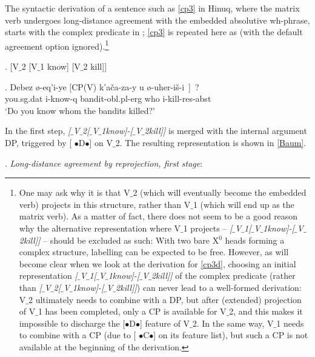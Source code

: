 \documentclass[output=paper
,modfonts
,nonflat]{langsci/langscibook}
\begin{document}
The syntactic derivation of a sentence such as \ref{cp3} in Hinuq,
where the matrix verb undergoes long-distance agreement with the
embedded absolutive wh-phrase, starts with the complex predicate in
\Next; \ref{cp3} is repeated here as \NNext (with the default
agreement option ignored).\footnote{\label{vari2}One may ask why it is
  that V$\_$2 (which will eventually become the embedded verb) projects
  in this structure, rather than V$\_$1 (which will end up as the matrix
  verb).  As a matter of fact, there does not seem to be a good reason
  why the alternative representation where V$\_$1 projects -- {\it
    [$\_${V$\_$1}[$\_${V$\_$1}know]-[$\_${V$\_$2}kill]]} -- should be excluded as such:
  With two bare X$^0$ heads forming a complex structure, labelling can
  be expected to be free. However, as will become clear when we look
  at the derivation for \ref{cp3d}, choosing an initial representation
  {\it [$\_${V$\_$1}[$\_${V$\_$1}know]-[$\_${V$\_$2}kill]]} of the complex predicate
  (rather than {\it [$\_${V$\_$2}[$\_${V$\_$1}know]-[$\_${V$\_$2}kill]]}) can never lead
  to a well-formed derivation: V$\_$2 ultimately needs to combine with a
  DP, but after (extended) projection of V$\_$1 has been completed, only
  a CP is available for V$\_$2, and this makes it impossible to discharge
  the [{\small $\bullet$}D{\small $\bullet$}] feature of V$\_$2. In the
  same way, V$\_$1 needs to combine with a CP (due to [{\small
      $\bullet$}C{\small $\bullet$}] on its feature list), but such a
  CP is not available at the beginning of the derivation.}

\Lsciexi. [V$\_$2 [V$\_$1 know] [V$\_$2 kill]]

 \exig.  \label{cp3d}Debez \o -eq'i-ye [CP(V) k'a\v{c}a\textgamma -za-y \textbeltl u \o -uher-i\v{s}-\textbeltl i~]~? \\
  you.{\sc sg.dat} {\sc i}-know-{\sc q} {} bandit-{\sc obl.pl-erg}
  who {\sc i}-kill-{\sc res-abst} \\ 
 `Do you know whom the bandits killed?'

In the first step, {\it [$\_${V$\_$2}[$\_${V$\_$1}know]-[$\_${V$\_$2}kill]]} is merged
with  the internal argument DP, triggered by  [{\small
    $\bullet$}D{\small $\bullet$}] on V$\_$2. The resulting
representation is shown in \ref{Baum}.

\Lsciexi. {\it Long-distance agreement \label{Baum}by reprojection, first stage}:
\end{document}
